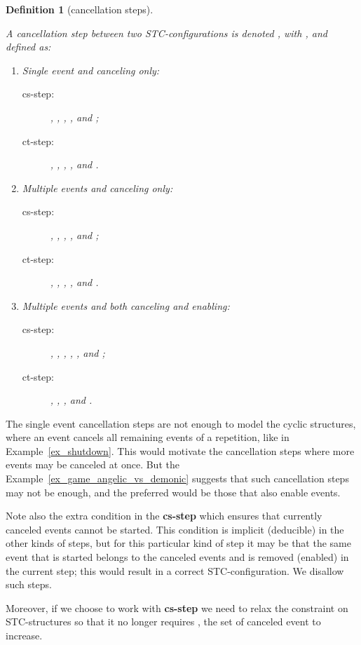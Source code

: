 \documentclass[submission,copyright,creativecommons]{eptcs}
\newtheorem{definition}[theorem]{Definition}
\begin{document}
\begin{definition}[cancellation steps]\label{def_c_steps}\ 

A \emph{cancellation step} between two STC-configurations is denoted , with , and defined as:
\begin{enumerate}
\item Single event and canceling only:
\begin{description}
\item[cs-step:] , , , ,  and ;
\item[ct-step:] , , , ,  and .
\end{description}

\item Multiple events and canceling only:
\begin{description}
\item[cs-step:] , , , ,  and ;
\item[ct-step:] , , , ,  and .
\end{description}

\item Multiple events and both canceling and enabling:
\begin{description}
\item[cs-step:] , , , , , and ;
\item[ct-step:] , , ,  and .
\end{description}
\end{enumerate}
\end{definition}


The single event cancellation steps are not enough to model the cyclic structures, where an event cancels all remaining events of a repetition, like in Example~\ref{ex_shutdown}. This would motivate the cancellation steps where more events may be canceled at once. But the Example~\ref{ex_game_angelic_vs_demonic} suggests that such cancellation steps may not be enough, and the preferred would be those that also enable events.

Note also the extra condition in the \textbf{cs-step} which ensures that currently canceled events cannot be started. This condition is implicit (deducible) in the other kinds of steps, but for this particular kind of step it may be that the same event that is started belongs to the canceled events and is removed (enabled) in the current step; this would result in a correct STC-configuration. We disallow such steps.

Moreover, if we choose to work with \textbf{cs-step} we need to relax the constraint on STC-structures so that it no longer requires , the set of canceled event to increase.
\end{document}
